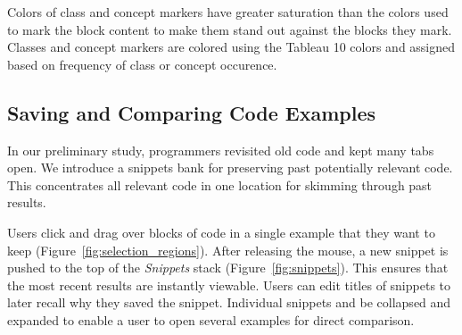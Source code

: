 Colors of class and concept markers have greater saturation than the colors used to mark the block content to make them stand out against the blocks they mark.
Classes and concept markers are colored using the Tableau 10 colors and assigned based on frequency of class or concept occurence.

\subsection{Saving and Comparing Code Examples}

In our preliminary study, programmers revisited old code and kept many tabs open.
We introduce a snippets bank for preserving past potentially relevant code.
This concentrates all relevant code in one location for skimming through past results.

Users click and drag over blocks of code in a single example that they want to keep (Figure~\ref{fig:selection_regions}).
After releasing the mouse, a new snippet is pushed to the top of the \emph{Snippets} stack (Figure~\ref{fig:snippets}).
This ensures that the most recent results are instantly viewable.
Users can edit titles of snippets to later recall why they saved the snippet.
Individual snippets and be collapsed and expanded to enable a user to open several examples for direct comparison.

